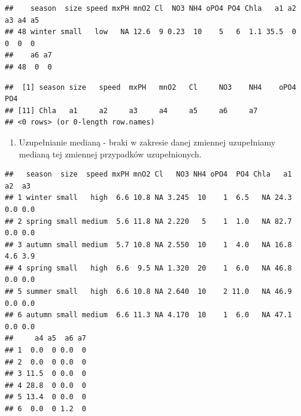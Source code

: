 \documentclass[]{book}
\newenvironment{Shaded}{\begin{snugshade}}{\end{snugshade}}
\newcommand{\DataTypeTok}[1]{\textcolor[rgb]{0.13,0.29,0.53}{#1}}
\newcommand{\KeywordTok}[1]{\textcolor[rgb]{0.13,0.29,0.53}{\textbf{#1}}}
\newcommand{\NormalTok}[1]{#1}
\newcommand{\OperatorTok}[1]{\textcolor[rgb]{0.81,0.36,0.00}{\textbf{#1}}}
\newcommand{\StringTok}[1]{\textcolor[rgb]{0.31,0.60,0.02}{#1}}
\providecommand{\tightlist}{%
  \setlength{\itemsep}{0pt}\setlength{\parskip}{0pt}}
\theoremstyle{plain}
\theoremstyle{definition}
\theoremstyle{definition}
\theoremstyle{definition}
\theoremstyle{definition}
\theoremstyle{remark}
\begin{document}
\begin{Shaded}
\end{Shaded}

\begin{verbatim}
##    season  size speed mxPH mnO2 Cl  NO3 NH4 oPO4 PO4 Chla   a1 a2 a3 a4 a5
## 48 winter small   low   NA 12.6  9 0.23  10    5   6  1.1 35.5  0  0  0  0
##    a6 a7
## 48  0  0
\end{verbatim}

\begin{Shaded}
\end{Shaded}

\begin{verbatim}
##  [1] season size   speed  mxPH   mnO2   Cl     NO3    NH4    oPO4   PO4   
## [11] Chla   a1     a2     a3     a4     a5     a6     a7    
## <0 rows> (or 0-length row.names)
\end{verbatim}

\begin{enumerate}
\def\labelenumi{\arabic{enumi}.}
\setcounter{enumi}{1}
\tightlist
\item
  Uzupełnianie medianą - braki w zakresie danej zmiennej uzupełniamy medianą tej zmiennej przypadków uzupełnionych.
\end{enumerate}

\begin{Shaded}
\end{Shaded}

\begin{verbatim}
##   season  size  speed mxPH mnO2 Cl   NO3 NH4 oPO4  PO4 Chla   a1  a2  a3
## 1 winter small   high  6.6 10.8 NA 3.245  10    1  6.5   NA 24.3 0.0 0.0
## 2 spring small medium  5.6 11.8 NA 2.220   5    1  1.0   NA 82.7 0.0 0.0
## 3 autumn small medium  5.7 10.8 NA 2.550  10    1  4.0   NA 16.8 4.6 3.9
## 4 spring small   high  6.6  9.5 NA 1.320  20    1  6.0   NA 46.8 0.0 0.0
## 5 summer small   high  6.6 10.8 NA 2.640  10    2 11.0   NA 46.9 0.0 0.0
## 6 autumn small medium  6.6 11.3 NA 4.170  10    1  6.0   NA 47.1 0.0 0.0
##     a4 a5  a6 a7
## 1  0.0  0 0.0  0
## 2  0.0  0 0.0  0
## 3 11.5  0 0.0  0
## 4 28.8  0 0.0  0
## 5 13.4  0 0.0  0
## 6  0.0  0 1.2  0
\end{verbatim}
\end{document}
